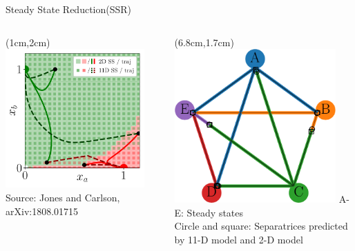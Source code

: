 \documentclass[15pt]{beamer}
\begin{document}
\begin{frame}{Steady State Reduction(SSR)}
\begin{columns}
\begin{textblock*}{6cm}(1cm,2cm) %
	 \includegraphics[width=0.9\textwidth]{fig4_no_inset_v0}\\[-1ex]
	 {\tiny Source: Jones and Carlson, arXiv:1808.01715}
	\end{textblock*}

	\begin{textblock*}{6cm}(6.8cm,1.7cm) %
	 \includegraphics[width=0.9\textwidth]{attractor_network_v3}
	 {A-E: Steady states\\ Circle and square: Separatrices predicted by 11-D model and 2-D model}
	\end{textblock*}
\end{columns}
\end{frame}
\end{document}
